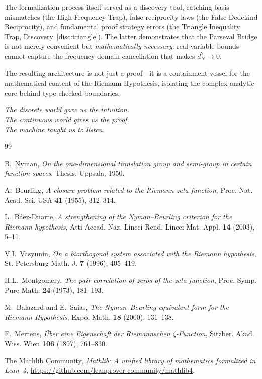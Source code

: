 \documentclass[11pt,a4paper]{article}
\theoremstyle{definition}
\begin{document}
The formalization process itself served as a discovery tool, catching
basis mismatches (the High-Frequency Trap), false reciprocity laws
(the False Dedekind Reciprocity), and fundamental proof strategy errors
(the Triangle Inequality Trap, Discovery~\ref{disc:triangle}).
The latter demonstrates that the Parseval Bridge is not merely
convenient but \emph{mathematically necessary}: real-variable bounds
cannot capture the frequency-domain cancellation that makes $d_N^2 \to 0$.

The resulting architecture is not just a proof---it is a containment
vessel for the mathematical content of the Riemann Hypothesis, isolating
the complex-analytic core behind type-checked boundaries.

\begin{flushright}
\emph{The discrete world gave us the intuition.\\
The continuous world gives us the proof.\\
The machine taught us to listen.}
\end{flushright}

\begin{thebibliography}{99}

B.~Nyman, \emph{On the one-dimensional translation group and semi-group in
certain function spaces}, Thesis, Uppsala, 1950.

A.~Beurling, \emph{A closure problem related to the Riemann zeta function},
Proc. Nat. Acad. Sci. USA \textbf{41} (1955), 312--314.

L.~B\'aez-Duarte, \emph{A strengthening of the Nyman--Beurling criterion for
the Riemann hypothesis}, Atti Accad. Naz. Lincei Rend. Lincei Mat. Appl.
\textbf{14} (2003), 5--11.

V.I.~Vasyunin, \emph{On a biorthogonal system associated with the Riemann
hypothesis}, St. Petersburg Math. J. \textbf{7} (1996), 405--419.

H.L.~Montgomery, \emph{The pair correlation of zeros of the zeta function},
Proc. Symp. Pure Math. \textbf{24} (1973), 181--193.

M.~Balazard and E.~Saias, \emph{The Nyman--Beurling equivalent form for the
Riemann Hypothesis}, Expo. Math. \textbf{18} (2000), 131--138.

F.~Mertens, \emph{\"Uber eine Eigenschaft der Riemannschen $\zeta$-Function},
Sitzber. Akad. Wiss. Wien \textbf{106} (1897), 761--830.

The Mathlib Community, \emph{Mathlib: A unified library of mathematics
formalized in Lean~4}, \url{https://github.com/leanprover-community/mathlib4}.

\end{thebibliography}
\end{document}
